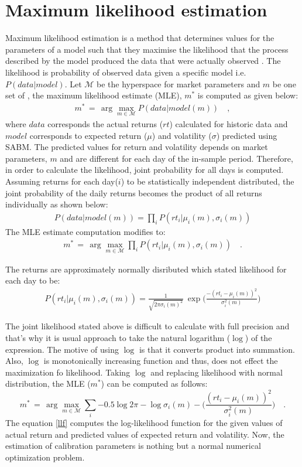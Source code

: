 \section{Maximum likelihood estimation}
Maximum likelihood estimation is a method that determines values for the parameters of a model such that they maximise the likelihood that the process described by the model produced the data that were actually observed \cite{a7}. The likelihood is probability of observed data given a specific model i.e. $P(data|model)$. Let $\mathcal{M}$ be the hyperspace for market parameters and $m$ be one set of , the maximum likelihood estimate (MLE), $m^*$ is computed as given below:
\begin{align*}
m^*\,=\,\arg\max_{m\in \mathcal{M}}{P(data | model(m))} \quad,
\end{align*}
where $data$ corresponds the actual returns ($rt$) calculated for historic data and $model$ corresponds to expected return ($\mu$) and volatility ($\sigma$) predicted using SABM. The predicted values for return and volatility depends on market parameters, $m$ and are different for each day of the in-sample period. Therefore, in order to calculate the likelihood, joint probability for all days is computed. Assuming returns for each day($i$) to be statistically independent distributed, the joint probability of the daily returns becomes the product of all returns individually as shown below:
\begin{align*}
P(data | model(m)) = \prod_{i} {P(rt_i | \mu_i(m), \sigma_i(m))}
\end{align*}
The MLE estimate computation modifies to:
\begin{align*}
m^*\,=\,\arg\max_{m\in \mathcal{M}}{\prod_{i} {P(rt_i | \mu_i(m), \sigma_i(m))}} \quad.
\end{align*}

The returns are approximately normally disributed which stated likelihood for each day to be:
\begin{align*}
P(rt_i | \mu_i(m), \sigma_i(m)) = \frac{1}{\sqrt{2\pi\sigma_i(m)^2}} \ \exp{\Big(\frac{-(rt_i - \mu_i(m))^2}{\sigma_i^2(m)} \Big)}  
\end{align*}

The joint likelihood stated above is difficult to calculate with full precision and that’s why it is usual approach to take the natural logarithm ($\log$) of the expression. The motive of using $\log$ is that it converts product into summation. Also, $\log$ is monotonically increasing function and thus, does not effect the maximization fo likelihood. Taking $\log$ and replacing likelihood with normal distribution, the MLE ($m^*$) can be computed as follows:
\begin{equation} \label{llf}
m^*\,=\,\arg\max_{m\in \mathcal{M}}{\sum_{i} {-0.5\log{2\pi} - \log{\sigma_i(m)} - \Big(\frac{(rt_i - \mu_i(m))^2}{\sigma_i^2(m)} \Big)}} \quad.
\end{equation}
The equation \ref{llf} computes the log-likelihood function for the given values of actual return and predicted values of expected return and volatility. Now, the estimation of calibration parameters is nothing but a normal numerical optimization problem.

